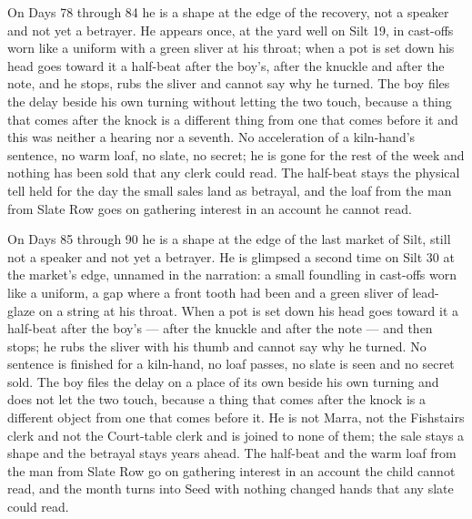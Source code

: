 \documentclass{design/chronicle}
\begin{document}
{On Days 78 through 84 he is a shape at the edge of the recovery, not a speaker and not yet a betrayer. He appears once, at the yard well on Silt 19, in cast-offs worn like a uniform with a green sliver at his throat; when a pot is set down his head goes toward it a half-beat after the boy’s, after the knuckle and after the note, and he stops, rubs the sliver and cannot say why he turned. The boy files the delay beside his own turning without letting the two touch, because a thing that comes after the knock is a different thing from one that comes before it and this was neither a hearing nor a seventh. No acceleration of a kiln-hand’s sentence, no warm loaf, no slate, no secret; he is gone for the rest of the week and nothing has been sold that any clerk could read. The half-beat stays the physical tell held for the day the small sales land as betrayal, and the loaf from the man from Slate Row goes on gathering interest in an account he cannot read.

On Days 85 through 90 he is a shape at the edge of the last market of Silt, still not a speaker and not yet a betrayer. He is glimpsed a second time on Silt 30 at the market’s edge, unnamed in the narration: a small foundling in cast-offs worn like a uniform, a gap where a front tooth had been and a green sliver of lead-glaze on a string at his throat. When a pot is set down his head goes toward it a half-beat after the boy’s --- after the knuckle and after the note --- and then stops; he rubs the sliver with his thumb and cannot say why he turned. No sentence is finished for a kiln-hand, no loaf passes, no slate is seen and no secret sold. The boy files the delay on a place of its own beside his own turning and does not let the two touch, because a thing that comes after the knock is a different object from one that comes before it. He is not Marra, not the Fishstairs clerk and not the Court-table clerk and is joined to none of them; the sale stays a shape and the betrayal stays years ahead. The half-beat and the warm loaf from the man from Slate Row go on gathering interest in an account the child cannot read, and the month turns into Seed with nothing changed hands that any slate could read.

}
\end{document}
